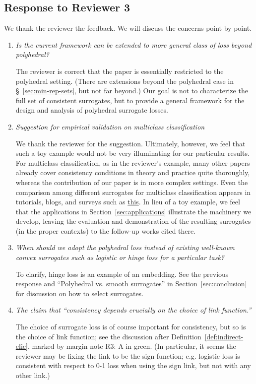 \documentclass[a4paper]{article}
\begin{document}
\subsection*{Response to Reviewer 3}

We thank the reviewer the feedback. We will discuss the concerns point by point.

\begin{enumerate}
	\item \emph{Is the current framework can be extended to more general class of loss beyond polyhedral?}
	
	The reviewer is correct that the paper is essentially restricted to the polyhedral setting.  (There are extensions beyond the polyhedral case in \S~\ref{sec:min-rep-sets}, but not far beyond.)  Our goal is not to characterize the full set of consistent surrogates, but to provide a general framework for the design and analysis of polyhedral surrogate losses.
	
	\item \emph{Suggestion for empirical validation on multiclass classification}
	
	We thank the reviewer for the suggestion.  Ultimately, however, we feel that such a toy example would not be very illuminating for our particular results.  For multiclass classification, as in the reviewer’s example, many other papers already cover consistency conditions in theory and practice quite thoroughly, whereas the contribution of our paper is in more complex settings.  Even the comparison among different surrogates for multiclass classification appears in tutorials, blogs, and surveys such as \href{https://faculty.ist.psu.edu/vhonavar/Courses/ds310/lossfunc.pdf}{this}. 
	In lieu of a toy example, we feel that the applications in Section~\ref{sec:applications} illustrate the machinery we develop, leaving the evaluation and demonstration of the resulting surrogates (in the proper contexts) to the follow-up works cited there.
	
	\item \emph{When should we adopt the polyhedral loss instead of existing well-known convex surrogates such as logistic or hinge loss for a particular task?}
	
	To clarify, hinge loss is an example of an embedding.  See the previous response and “Polyhedral vs. smooth surrogates” in Section~\ref{sec:conclusion} for discussion on how to select surrogates.
	
	\item \emph{The claim that ``consistency depends crucially on the choice of link function.''}

	The choice of surrogate loss is of course important for consistency, but so is the choice of link function; see the discussion after Definition~\ref{def:indirect-elic}, marked by margin note R3: A in green.  
	(In particular, it seems the reviewer may be fixing the link to be the sign function; e.g. logistic loss is consistent with respect to 0-1 loss when using the sign link, but not with any other link.)	
	
\end{enumerate}
\end{document}
